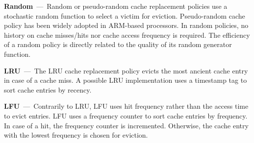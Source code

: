 \textbf{Random}~---~Random or pseudo-random cache replacement policies use a stochastic random function to select a victim for eviction.
Pseudo-random cache policy has been widely adopted in ARM-based processors.
In random policies, no history on cache misses/hits nor cache access frequency is required.
The efficiency of a random policy is directly related to the quality of its random generator function.

\textbf{LRU}~---~The LRU cache replacement policy evicts the most ancient cache entry in case of a cache miss.
A possible LRU implementation uses a timestamp tag to sort cache entries by recency.%


\textbf{LFU}~---~Contrarily to LRU, LFU uses hit frequency rather than the access time to evict entries.
LFU uses a frequency counter to sort cache entries by frequency.
In case of a hit, the frequency counter is incremented.
Otherwise, the cache entry with the lowest frequency is chosen for eviction.%
%


